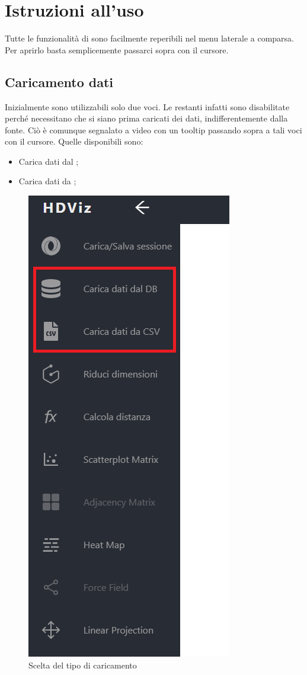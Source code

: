 \section{Istruzioni all'uso}
Tutte le funzionalità di \NomeProgetto{} sono facilmente reperibili nel menu laterale a comparsa. Per aprirlo basta semplicemente passarci sopra con il cursore.

\subsection{Caricamento dati}

Inizialmente sono utilizzabili solo due voci. Le restanti infatti sono disabilitate perché necessitano che si siano prima caricati dei dati, indifferentemente dalla fonte. Ciò è comunque segnalato a video con un tooltip passando sopra a tali voci con il cursore.
Quelle disponibili sono:
\begin{itemize}
	\item Carica dati dal ;
	\item Carica dati da ;
\end{itemize}

\begin{figure}[H]
		\includegraphics[scale=0.6]{Images/SceltaCaricamento.png}
		\centering
		\caption{Scelta del tipo di caricamento}
\end{figure}


